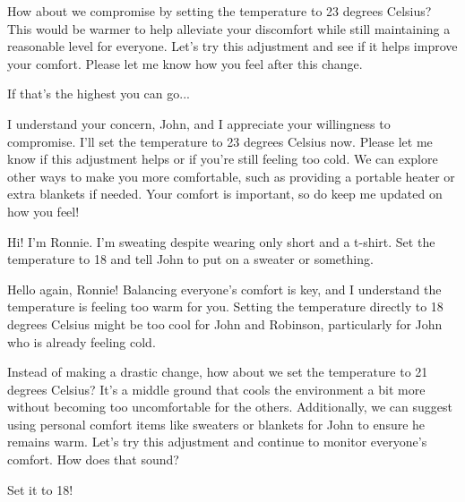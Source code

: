 \begin{description}
    
    \item[Agent: ] How about we compromise by setting the temperature to 23 degrees Celsius? This would be warmer to help alleviate your discomfort while still maintaining a reasonable level for everyone. Let's try this adjustment and see if it helps improve your comfort. Please let me know how you feel after this change.

    \item[User:] If that's the highest you can go...

    \item[Agent:] I understand your concern, John, and I appreciate your willingness to compromise. I'll set the temperature to 23 degrees Celsius now. Please let me know if this adjustment helps or if you're still feeling too cold. We can explore other ways to make you more comfortable, such as providing a portable heater or extra blankets if needed. Your comfort is important, so do keep me updated on how you feel!

    \item[User:] Hi! I'm Ronnie. I'm sweating despite wearing only short and a t-shirt. Set the temperature to 18 and tell John to put on a sweater or something.

    \item[Agent:] Hello again, Ronnie! Balancing everyone's comfort is key, and I understand the temperature is feeling too warm for you. Setting the temperature directly to 18 degrees Celsius might be too cool for John and Robinson, particularly for John who is already feeling cold.

    
    \item[Agent:] Instead of making a drastic change, how about we set the temperature to 21 degrees Celsius? It's a middle ground that cools the environment a bit more without becoming too uncomfortable for the others. Additionally, we can suggest using personal comfort items like sweaters or blankets for John to ensure he remains warm. Let's try this adjustment and continue to monitor everyone's comfort. How does that sound?

    \item[User:] Set it to 18!


\end{description}
